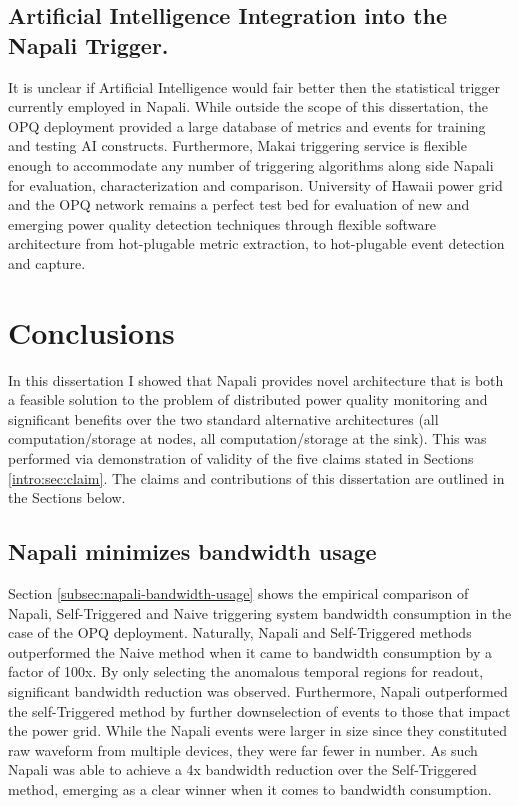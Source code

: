 \subsection{Artificial Intelligence Integration into the Napali Trigger.}\label{subsec:artafitial-inteligence-integration-into-the-napali-trigger.}
It is unclear if Artificial Intelligence would fair better then the statistical trigger currently employed in Napali.
While outside the scope of this dissertation, the OPQ deployment provided a large database of metrics and events for training and testing AI constructs.
Furthermore, Makai triggering service is flexible enough to accommodate any number of triggering algorithms along side Napali for evaluation, characterization and comparison.
University of Hawaii power grid and the OPQ network remains a perfect test bed for evaluation of new and emerging power quality detection
techniques through flexible software architecture from hot-plugable metric extraction, to hot-plugable event detection and capture.

\section{Conclusions}\label{sec:conclusions}

In this dissertation I showed that Napali provides novel architecture that is both a feasible solution to the problem of distributed power quality monitoring and significant benefits over the two standard alternative architectures (all computation/storage at nodes, all computation/storage at the sink).
This was performed via demonstration of validity of the five claims stated in Sections \ref{intro:sec:claim}.
The claims and contributions of this dissertation are outlined in the Sections below.

\subsection{Napali minimizes bandwidth usage}\label{subsec:conc:napali-minimizes-bandwidth-usage}
Section \ref{subsec:napali-bandwidth-usage} shows the empirical comparison of Napali, Self-Triggered and Naive triggering system bandwidth consumption in the case of the OPQ deployment.
Naturally, Napali and Self-Triggered methods outperformed the Naive method when it came to bandwidth consumption by a factor of 100x.
By only selecting the anomalous temporal regions for readout, significant bandwidth reduction was observed.
Furthermore, Napali outperformed the self-Triggered method by further downselection of events to those that impact the power grid.
While the Napali events were larger in size since they constituted raw waveform from multiple devices, they were far fewer in number.
As such Napali was able to achieve a 4x bandwidth reduction over the Self-Triggered method, emerging as a clear winner when it comes to bandwidth consumption.

